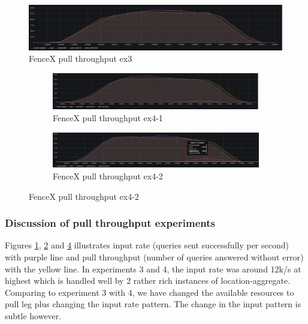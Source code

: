 \documentclass[a4]{report}
\begin{document}
    \begin{figure}
        \caption{FenceX pull throughput ex3}
        \label{fig:ex3}
        \includegraphics[width=\textwidth, height=0.3\textheight]{images/evaluation/ex3-benchmarking(16,9).png}
    \end{figure}

    \begin{figure}
        \centering
        \begin{subfigure}[b]{\textwidth}
            \centering
            \caption{FenceX pull throughput ex4-1}
            \label{fig:ex4-1}
            \includegraphics[width=\textwidth, height=0.3\textheight, scale=2]{images/evaluation/ex4-benchmarking(19,10).png}
        \end{subfigure}

        \begin{subfigure}[b]{\textwidth}
            \centering
            \caption{FenceX pull throughput ex4-2}
            \label{fig:ex4-2}
            \includegraphics[width=\textwidth, height=0.3\textheight, scale=2]{images/evaluation/ex4-benchmarking(22,10).png}
        \end{subfigure}
    \end{figure}

    \clearpage

    \subsubsection{Discussion of pull throughput experiments}
    Figures \ref{fig:ex3}, \ref{fig:ex4-1} and \ref{fig:ex4-2} illustrates input rate (queries sent successfully per
    second) with purple line and pull throughput (number of queries answered without error) with the yellow line.
    In experiments 3 and 4, the input rate was around 12k/s at highest which is handled well by 2 rather rich
    instances of location-aggregate.
    Comparing to experiment 3 with 4, we have changed the available resources to pull leg plus changing the input
    rate pattern.
    The change in the input pattern is subtle however.
\end{document}
